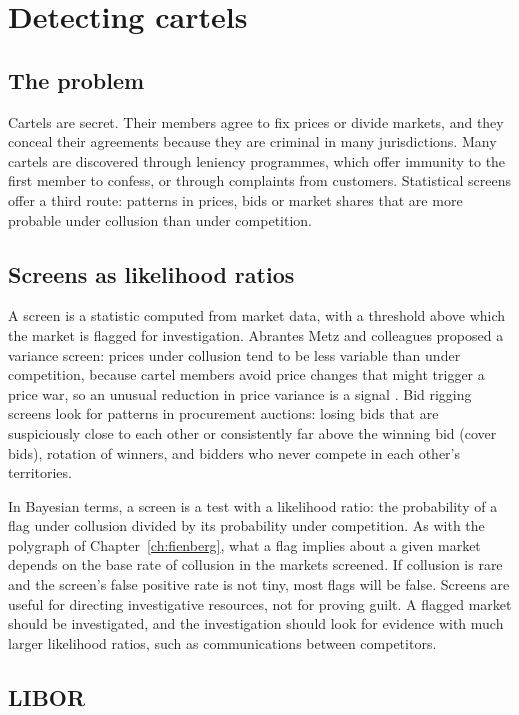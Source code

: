 \section{Detecting cartels}

\subsection{The problem}

Cartels are secret. Their members agree to fix prices or divide markets, and they conceal their agreements because they are criminal in many jurisdictions. Many cartels are discovered through leniency programmes, which offer immunity to the first member to confess, or through complaints from customers. Statistical screens offer a third route: patterns in prices, bids or market shares that are more probable under collusion than under competition.

\subsection{Screens as likelihood ratios}

A screen is a statistic computed from market data, with a threshold above which the market is flagged for investigation. Abrantes Metz and colleagues proposed a variance screen: prices under collusion tend to be less variable than under competition, because cartel members avoid price changes that might trigger a price war, so an unusual reduction in price variance is a signal \citep{abrantes2006}. Bid rigging screens look for patterns in procurement auctions: losing bids that are suspiciously close to each other or consistently far above the winning bid (cover bids), rotation of winners, and bidders who never compete in each other's territories.

In Bayesian terms, a screen is a test with a likelihood ratio: the probability of a flag under collusion divided by its probability under competition. As with the polygraph of Chapter~\ref{ch:fienberg}, what a flag implies about a given market depends on the base rate of collusion in the markets screened. If collusion is rare and the screen's false positive rate is not tiny, most flags will be false. Screens are useful for directing investigative resources, not for proving guilt. A flagged market should be investigated, and the investigation should look for evidence with much larger likelihood ratios, such as communications between competitors.

\subsection{LIBOR}

